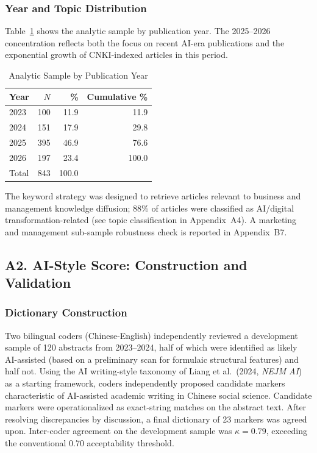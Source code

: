 \documentclass[12pt,a4paper]{article}
\begin{document}
\subsubsection*{Year and Topic Distribution}

Table~\ref{tab:yeardist} shows the analytic sample by publication year.
The 2025--2026 concentration reflects both the focus on recent AI-era
publications and the exponential growth of CNKI-indexed articles in
this period.

\begin{table}[htbp]
\centering
\caption{Analytic Sample by Publication Year}
\label{tab:yeardist}
\begin{tabular}{lrrr}
\toprule
Year & $N$ & \% & Cumulative \% \\
\midrule
2023 & 100 & 11.9 & 11.9 \\
2024 & 151 & 17.9 & 29.8 \\
2025 & 395 & 46.9 & 76.6 \\
2026 & 197 & 23.4 & 100.0 \\
\midrule
Total & 843 & 100.0 & \\
\bottomrule
\end{tabular}
\end{table}

The keyword strategy was designed to retrieve articles relevant to
business and management knowledge diffusion; 88\% of articles were
classified as AI/digital transformation-related (see topic
classification in Appendix~A4).
A marketing and management sub-sample robustness check is reported
in Appendix~B7.

\subsection*{A2. AI-Style Score: Construction and Validation}

\subsubsection*{Dictionary Construction}

Two bilingual coders (Chinese-English) independently reviewed a
development sample of 120 abstracts from 2023--2024, half of which
were identified as likely AI-assisted (based on a preliminary scan
for formulaic structural features) and half not.
Using the AI writing-style taxonomy of Liang et al.\ (2024, \textit{NEJM AI})
as a starting framework, coders independently proposed candidate markers
characteristic of AI-assisted academic writing in Chinese social science.
Candidate markers were operationalized as exact-string matches on the
abstract text.
After resolving discrepancies by discussion, a final dictionary of
23 markers was agreed upon.
Inter-coder agreement on the development sample was $\kappa = 0.79$,
exceeding the conventional 0.70 acceptability threshold.
\end{document}
